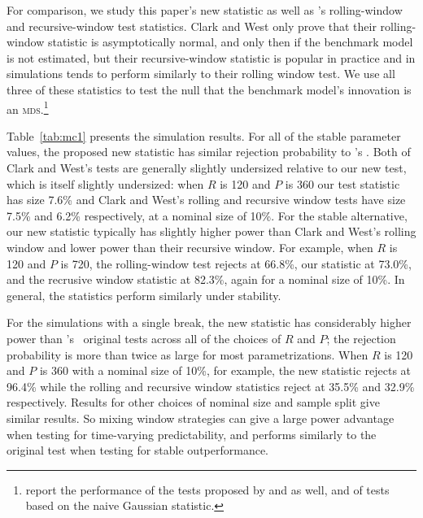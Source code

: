 \documentclass[11pt,fleqn]{article}
\newcommand\citepos[2][]{\citeauthor{#2}'s \citeyearpar[#1]{#2}}
\newcommand\poscw{\citeauthor{ClW:06}'s \citeyearpar{ClW:06,ClW:07}}
\theoremstyle{definition}
\newcommand{\mds}{\textsc{mds}}
\newcommand{\oos}{\textsc{oos}}
\begin{document}
For comparison, we study this paper's new statistic as well as \poscw
rolling-window and recursive-window test statistics.  Clark and West
only prove that their rolling-window statistic is asymptotically
normal, and only then if the benchmark model is not estimated, but
their recursive-window statistic is popular in practice and in
simulations tends to perform similarly to their rolling window test.
We use all three of these statistics to test the null that the
benchmark model's innovation is an \mds.\footnote{\citet{ClW:07}
  report the performance of the tests proposed by \citet{CCS:01} and
  \citet{ClM:05} as well, and of tests based on the naive Gaussian
  statistic.}

\begin{table}[tb]
  \centering
  
  \caption{Size and power of the \oos\ tests in the simulations 
    described by Section~\ref{sec:2}, at
    \testsize\% confidence.  These percentages are calculated from \totalsims\
    samples.  Pr[\textsc{cw} roll.] shows the fraction of simulations for
    which Clark and West's (2007) rolling-window statistic rejects; 
    Pr[\textsc{cw} rec.] shows the fraction of simulations for which 
    their recursive-window statistic rejects; and Pr[new] shows the fraction of
    simulations for which this paper's test rejects.}
\label{tab:mc1}
\end{table}

Table~\ref{tab:mc1} presents the simulation results.  For all of the
stable parameter values, the proposed new statistic has similar
rejection probability to \citepos{ClW:07}.  Both of Clark and West's
tests are generally slightly undersized relative to our new test,
which is itself slightly undersized: when $R$ is 120 and $P$ is 360
our test statistic has size 7.6\% and Clark and West's rolling and
recursive window tests have size 7.5\% and 6.2\% respectively, at a
nominal size of 10\%.  For the stable alternative, our new statistic
typically has slightly higher power than Clark and West's rolling
window and lower power than their recursive window.  For example, when
$R$ is 120 and $P$ is 720, the rolling-window test rejects at 66.8\%,
our statistic at 73.0\%, and the recrusive window statistic at 82.3\%,
again for a nominal size of 10\%.  In general, the statistics perform
similarly under stability.

For the simulations with a single break, the new statistic has
considerably higher power than \poscw\ original tests across all of
the choices of $R$ and $P$; the rejection probability is more than
twice as large for most parametrizations.  When $R$ is 120 and $P$ is
360 with a nominal size of 10\%, for example, the new statistic
rejects at 96.4\% while the rolling and recursive window statistics
reject at 35.5\% and 32.9\% respectively.  Results for other choices
of nominal size and sample split give similar results.  So mixing
window strategies can give a large power advantage when testing for
time-varying predictability, and performs similarly to the original
test when testing for stable outperformance.
\end{document}
